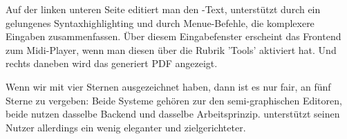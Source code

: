 Auf der linken unteren Seite editiert man den -Text, unterstützt
durch ein gelungenes Syntaxhighlighting und durch Menue-Befehle, die komplexere
Eingaben zusammenfassen. Über diesem Eingabefenster erscheint das Frontend zum
Midi-Player, wenn man diesen über die Rubrik 'Tools' aktiviert hat. Und rechts
daneben wird das generiert PDF angezeigt.

Wenn wir  mit vier Sternen ausgezeichnet haben, dann ist es nur
fair, an  fünf Sterne zu vergeben: Beide Systeme gehören zur den
semi-graphischen Editoren, beide nutzen dasselbe Backend und dasselbe
Arbeitsprinzip.  unterstützt seinen Nutzer allerdings ein wenig
eleganter und zielgerichteter.
%
